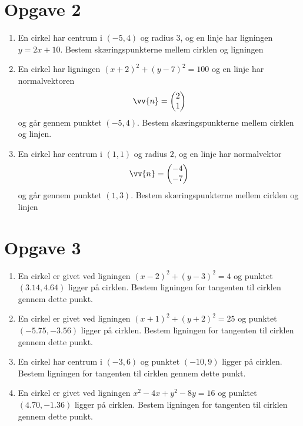 \section*{Opgave 2}
\begin{enumerate}[label=\roman*)]
	\item En cirkel har centrum i $(-5,4)$ og radius $3$, og en linje har ligningen $y = 2x+10$. Bestem skæringspunkterne mellem cirklen og ligningen
	\item En cirkel har ligningen $(x+2)^2+(y-7)^2 = 100$ og en linje har normalvektoren 
	\begin{align*}
		\vv{n} =
		\begin{pmatrix}
			2 \\ 1
		\end{pmatrix}
	\end{align*}
	og går gennem punktet $(-5,4)$. Bestem skæringspunkterne mellem cirklen og linjen. 
	\item En cirkel har centrum i $(1,1)$ og radius $2$, og en linje har normalvektor 
	\begin{align*}
		\vv{n} =
		\begin{pmatrix}
			-4 \\ -7			
		\end{pmatrix}
	\end{align*}
	og går gennem punktet $(1,3)$. Bestem skæringspunkterne mellem cirklen og linjen
\end{enumerate}

\section*{Opgave 3}
\begin{enumerate}[label=\roman*)]
	\item	En cirkel er givet ved ligningen $(x-2)^2 + (y-3)^2 = 4$ og punktet $(3.14,4.64)$
	ligger på cirklen. Bestem ligningen for tangenten til cirklen gennem dette punkt.
	\item	En cirkel er givet ved ligningen $(x+1)^2 + (y+2)^2 = 25$ og punktet
	 $(-5.75,-3.56)$
	ligger på cirklen. Bestem ligningen for tangenten til cirklen gennem dette punkt.	
	\item	En cirkel har centrum i $(-3,6)$ og punktet
	 $(-10,9)$
	ligger på cirklen. Bestem ligningen for tangenten til cirklen gennem dette punkt.	
	\item	En cirkel er givet ved ligningen $x^2-4x+y^2-8y=16$ og punktet
	 $(4.70,-1.36)$
	ligger på cirklen. Bestem ligningen for tangenten til cirklen gennem dette punkt.	
\end{enumerate}


